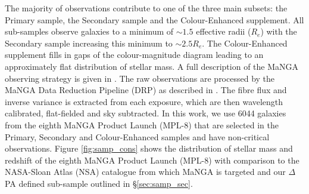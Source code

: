 \documentclass[fleqn,usenatbib]{mnras}
\begin{document}
The majority of observations contribute to one of the three main subsets: the Primary sample, the Secondary sample and the Colour-Enhanced supplement. All sub-samples observe galaxies to a minimum of $\sim 1.5$ effective radii ($R_{e}$) with the Secondary sample increasing this minimum to $\sim 2.5 R_{e}$. The Colour-Enhanced supplement fills in gaps of the colour-magnitude diagram leading to an approximately flat distribution of stellar mass. A full description of the MaNGA observing strategy is given in \citet{law2015obs,yan2016obs}. 
The raw observations are processed by the MaNGA Data 
Reduction Pipeline (DRP) as described in \citet{law2016drp, yan2016spec}. The fibre flux and inverse variance is extracted from each exposure, which are then wavelength calibrated, flat-fielded and sky subtracted. In this work, we use 6044 galaxies from the eighth MaNGA Product Launch (MPL-8) that are selected in the Primary, Secondary and Colour-Enhanced samples and have non-critical observations. Figure \ref{fig:samp_cons} shows the distribution of stellar mass and redshift of the eighth MaNGA Product Launch (MPL-8) with comparison to the NASA-Sloan Atlas (NSA) catalogue from which MaNGA is targeted and our $\Delta$PA defined sub-sample outlined in \S\ref{sec:samp_sec}.
\end{document}
